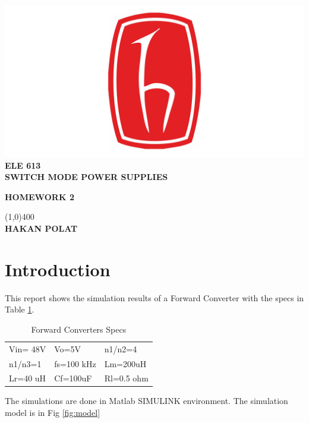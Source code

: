 \documentclass[oneside,12pt]{article}
\begin{document}
\begin{titlepage}
	\begin{center}
		
		\includegraphics[scale=0.7]{hulogo}\\
		\vspace{1cm}
		\large\textbf{ELE 613}\\
		\vspace{0.5cm}
		\large\textbf{SWITCH MODE POWER SUPPLIES}\\ 
		\vspace{0.5cm}
		
		\small\textbf{HOMEWORK 2}\\

		\vspace{0.5cm}
		
		\vspace{0.5cm}
		
		\line(1,0){400}\\
		\vspace{0.5cm}
	    \Large\textbf{HAKAN POLAT} 
	\end{center}
	

\end{titlepage}
\newpage
\section{Introduction}
This report shows the simulation results of a Forward Converter with the specs in Table \ref{my-label}.


\begin{table}[H]
	\centering
	\begin{tabular}{lll}
		Vin= 48V & Vo=5V      & n1/n2=4    \\
		n1/n3=1  & fs=100 kHz & Lm=200uH   \\
		Lr=40 uH & Cf=100uF   & Rl=0.5 ohm
	\end{tabular}
\caption{Forward Converters Specs}
\label{my-label}
\end{table}
The simulations are done in Matlab SIMULINK environment. The simulation model is in Fig \ref{fig:model}
\end{document}
